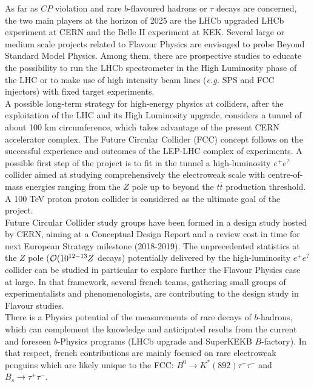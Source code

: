 As far as $CP$ violation and rare $b$-flavoured hadrons or $\tau$ decays are concerned, the two main players at the horizon of 2025 are the LHCb upgraded LHCb experiment at CERN and the Belle II experiment at KEK. Several large or medium scale projects related to Flavour Physics are envisaged to probe Beyond Standard Model Physics. Among them, there are prospective studies to educate the possibility to run the LHCb spectrometer in the High Luminosity phase of the LHC or to make use of high intensity beam lines ({\it e.g.} SPS and FCC injectors)  with fixed target experiments.       \\      

A possible long-term strategy for high-energy physics at colliders, after the exploitation of the LHC and its High Luminosity upgrade, considers a tunnel of about 100 km circumference, which takes advantage of the present CERN accelerator complex. The Future Circular Collider (FCC) concept follows on the successful experience and outcomes of the LEP-LHC complex of experiments. A possible first step of the project is to fit in the tunnel a high-luminosity $e^+e^?$ collider aimed at studying comprehensively the electroweak scale with centre-of-mass energies ranging from the $Z$ pole up to beyond the $t \bar t$ production threshold. A  100 TeV proton proton collider is considered as the ultimate goal of the project. \\

Future Circular Collider study groups have been formed in a design study hosted by CERN, aiming at a Conceptual Design Report and a review cost in time for next European Strategy milestone (2018-2019). The unprecedented statistics at the $Z$ pole (${\cal O}(10^{12-13} Z$ decays) potentially delivered by the high-luminosity $e^+e^?$ collider can be studied in particular to explore further the Flavour Physics case at large.  In that framework, several french teams, gathering small groups of experimentalists and phenomenologists, are contributing to the design study in Flavour studies.  \\

There is a Physics potential of the measurements of rare decays of $b$-hadrons, which can complement the knowledge and anticipated results from the current and foreseen $b$-Physics programs (LHCb upgrade and SuperKEKB $B$-factory). In that respect, french contributions are mainly focused on rare electroweak penguins which are likely unique to the FCC: $B^0 \to K^*(892) \tau^+\tau^-$ and $B_s \to \tau^+ \tau^-$.   \\

